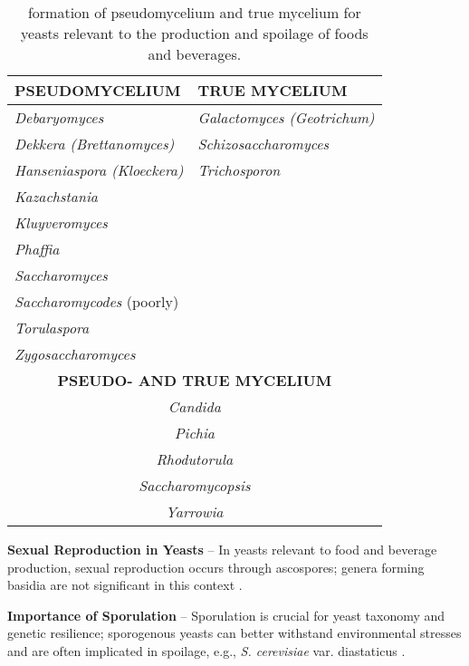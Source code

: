 \begin{table}[t]
    \centering
    \caption{formation of pseudomycelium and true mycelium for yeasts relevant to the production and spoilage of foods and beverages.}
    \label{tab:PseudoTrueMycelium}
    \begin{tabular}{l|l}   
    \textbf{PSEUDOMYCELIUM} & \textbf{TRUE MYCELIUM} \\ 
    \hline 
    \textit{Debaryomyces} & \textit{Galactomyces (Geotrichum)} \\ 
    \textit{Dekkera (Brettanomyces)} & \textit{Schizosaccharomyces} \\ 
    \textit{Hanseniaspora (Kloeckera)} & \textit{Trichosporon} \\ 
    \textit{Kazachstania} & \\ 
    \textit{Kluyveromyces} & \\ 
    \textit{Phaffia} & \\ 
    \textit{Saccharomyces} & \\ 
    \textit{Saccharomycodes} (poorly) & \\ 
    \textit{Torulaspora} & \\ 
    \textit{Zygosaccharomyces} & \\ 
    \hline 
    \multicolumn{2}{c}{\textbf{PSEUDO- AND TRUE MYCELIUM}} \\ 
    \hline 
    \multicolumn{2}{c}{\textit{Candida}} \\ 
    \multicolumn{2}{c}{\textit{Pichia}} \\ 
    \multicolumn{2}{c}{\textit{Rhodutorula}} \\ 
    \multicolumn{2}{c}{\textit{Saccharomycopsis}} \\ 
    \multicolumn{2}{c}{\textit{Yarrowia}} \\ 
    \end{tabular}
\end{table}



\textbf{Sexual Reproduction in Yeasts} – In yeasts relevant to food and beverage production, sexual reproduction occurs through ascospores; genera forming basidia are not significant in this context \cite*{L2-YeastClass}.

\textbf{Importance of Sporulation} – Sporulation is crucial for yeast taxonomy and genetic resilience; sporogenous yeasts can better withstand environmental stresses and are often implicated in spoilage, e.g., \textit{S. cerevisiae} var. diastaticus \cite*{L2-YeastClass}.

